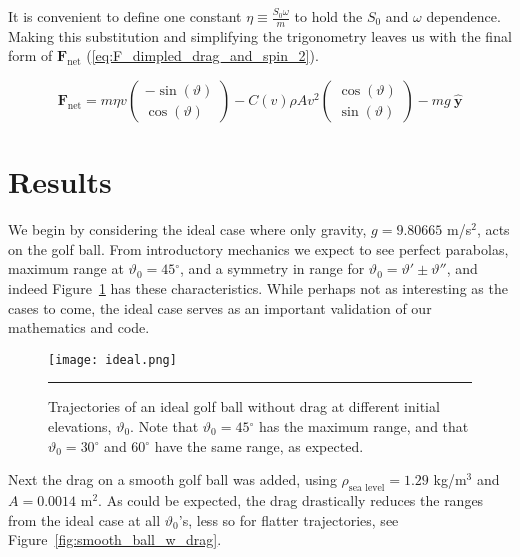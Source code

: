 \documentclass[notitlepage,aps,prd,nofootinbib]{revtex4-1}
\newcommand{\degree}{\ensuremath{^{\circ}}}
\begin{document}
It is convenient to define one constant $\eta \equiv \frac{S_{0} \omega}{m}$ to hold the $S_{0}$ and $\omega$ dependence. Making this substitution and simplifying the trigonometry leaves us with the final form of $\mathbf{F}_{\text{net}}$ (\ref{eq:F_dimpled_drag_and_spin_2}). 

\begin{equation} \label{eq:F_dimpled_drag_and_spin_2}
\mathbf{F}_{\text{net}} = m \eta v 
\begin{pmatrix}
  -\sin(\vartheta) \\
  \cos(\vartheta)
\end{pmatrix}
- C\left(v\right) \rho A v^{2}
\begin{pmatrix}
  \cos(\vartheta) \\
  \sin(\vartheta)
\end{pmatrix}
-m g~\hat{\mathbf{y}}
\end{equation}


\section{Results}
\label{sec:results}
We begin by considering the ideal case where only gravity, $g = 9.80665$ m/s$^2$, acts on the golf ball. From introductory mechanics we expect to see perfect parabolas, maximum range at $\vartheta_{0} = 45\degree$, and a symmetry in range for $\vartheta_{0} = \vartheta' \pm \vartheta''$, and indeed Figure~\ref{fig:ideal} has these characteristics. While perhaps not as interesting as the cases to come, the ideal case serves as an important validation of our mathematics and code. 

\vspace{-0.4cm}

\begin{figure}[!htbc]
  \centering
  \texttt{[image: ideal.png]}
	{\par\nobreak\rule[9pt]{35em}{0.5pt}\vspace{-5mm}}
	\caption{Trajectories of an ideal golf ball without drag at different initial elevations, $\vartheta_{0}$. Note that $\vartheta_{0} = 45\degree$ has the maximum range, and that $\vartheta_{0} = 30\degree$ and $60\degree$ have the same range, as expected.}
	\label{fig:ideal}
\end{figure}


Next the drag on a smooth golf ball was added, using $\rho_{\text{sea level}} = 1.29$ kg/m$^3$ and $A = 0.0014$ m$^2$. As could be expected, the drag drastically reduces the ranges from the ideal case at all $\vartheta_{0}$'s, less so for flatter trajectories, see Figure~\ref{fig:smooth_ball_w_drag}.
\end{document}
